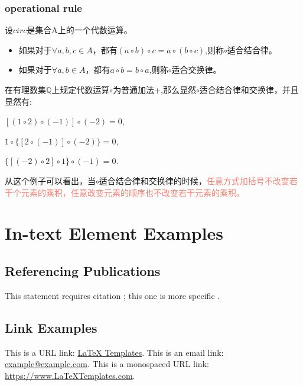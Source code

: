 \documentclass[
	11pt, %
	fleqn, %
	a4paper, %
]{LegrandOrangeBook}
\begin{document}
\subsection{operational rule}

\begin{theorem}
	设$circ$是集合A上的一个代数运算。
	\begin{itemize}
		\item 如果对于$\forall a,b,c\in A$，都有$(a\circ b)\circ c=a\circ(b\circ c)$,则称$\circ$适合结合律。
		\item 如果对于$\forall a,b\in A$，都有$a\circ b=b\circ a$,则称$\circ$适合交换律。
	\end{itemize}
\end{theorem}

\begin{example}
	在有理数集$\mathbb{Q}$上规定代数运算$\circ$为普通加法+,那么显然$\circ$适合结合律和交换律，并且显然有:
	\begin{center}
		$[(1\circ 2)\circ(-1)]\circ(-2)=0$,

		$1\circ\{[2\circ(-1)]\circ(-2)\}=0$,

		$\{[(-2)\circ 2]\circ 1\}\circ(-1)=0$.
	\end{center}
从这个例子可以看出，当$\circ$适合结合律和交换律的时候，\textcolor{Salmon}{任意方式加括号不改变若干个元素的乘积，任意改变元素的顺序也不改变若干元素的乘积。}
\end{example}

\chapter{In-text Element Examples}

\section{Referencing Publications}

This statement requires citation \cite{Smith:2022jd}; this one is more specific \cite[162]{Smith:2021qr}.


\section{Link Examples}

This is a URL link: \href{https://www.latextemplates.com}{LaTeX Templates}. This is an email link: \href{mailto:example@example.com}{example@example.com}. This is a monospaced URL link: \url{https://www.LaTeXTemplates.com}.
\end{document}

